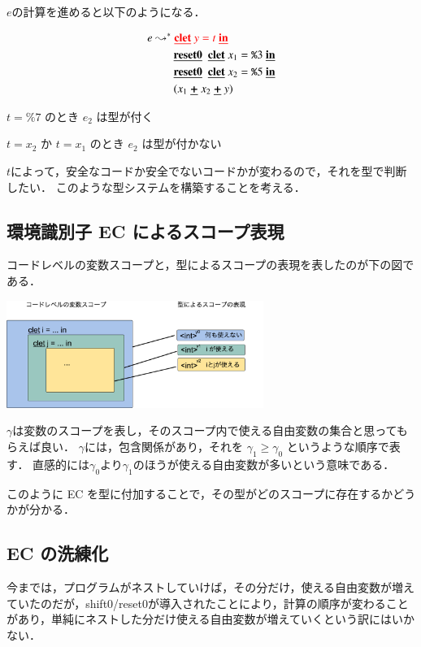 \documentclass[10pt,a4j,twocolumn]{jarticle}
\newcommand\cResetz{\underline{\textbf{reset0}}}
\newcommand\cPlus{\underline{\textbf{+}}}
\newcommand\cLet{\underline{\textbf{clet}}}
\newcommand\cIn{\underline{\textbf{in}}}
\newcommand\csp[1]{\texttt{\%}{#1}}
\newcommand\ord{\ge}
\newcommand\too{\leadsto^*}
\newcommand\red[1]{\textcolor{red}{#1}}
\theoremstyle{definition}
\begin{document}
$e$の計算を進めると以下のようになる．

\begin{align*}
  e & \too \red{\cLet~y=t~\cIn} \\
    & \phantom{\too}~~ \cResetz ~~\cLet~x_1=\csp{3}~\cIn \\
    & \phantom{\too}~~ \cResetz ~~\cLet~x_2=\csp{5}~\cIn \\
    & \phantom{\too}~~ (x_1~\cPlus~x_2~\cPlus~y)
\end{align*}

$t=\csp{7}$ のとき $e_2$ は型が付く

$t=x_2$ か $t=x_1$ のとき $e_2$ は型が付かない

$t$によって，安全なコードか安全でないコードかが変わるので，それを型で判断したい．
このような型システムを構築することを考える．

\subsection{環境識別子 EC によるスコープ表現\cite{Sudo2014}}
コードレベルの変数スコープと，型によるスコープの表現を表したのが下の図である．

\begin{center}
  \includegraphics[clip,height=3.5cm]{./img/eccletin.png}
\end{center}

$\gamma$は変数のスコープを表し，そのスコープ内で使える自由変数の集合と思ってもらえば良い．
$\gamma$には，包含関係があり，それを $\gamma_1 \ord \gamma_0$ というような順序で表す．
直感的には$\gamma_0$より$\gamma_1$のほうが使える自由変数が多いという意味である．

このように EC を型に付加することで，その型がどのスコープに存在するかどうかが分かる．

\subsection{EC の洗練化}
今までは，プログラムがネストしていけば，その分だけ，使える自由変数が増えていたのだが，shift0/reset0が導入されたことにより，計算の順序が変わることがあり，単純にネストした分だけ使える自由変数が増えていくという訳にはいかない．
\end{document}
